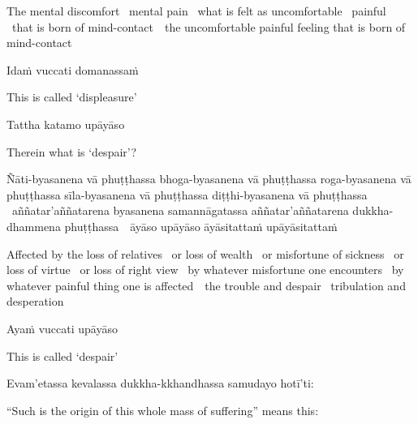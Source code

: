 \begin{english-hang-verses}
  The mental discomfort \breathmark\ mental pain \breathmark\ what is felt as uncomfortable \breathmark\ painful \breathmark\ that is born of \mbox{mind-contact}~\breathmark\ the uncomfortable painful feeling that is born of mind-contact
\end{english-hang-verses}

Idaṁ vuccati domanassaṁ

\begin{english}
  This is called `displeasure'
\end{english}

\ifninebythirteen\clearpage\fi

Tattha katamo upāyāso

\begin{english}
  Therein what is `despair'?
\end{english}

\begin{pali-hang}
  Ñāti-byasanena vā phuṭṭhassa bhoga-byasanena vā phuṭṭhassa roga-byasanena vā phuṭṭhassa sīla-byasanena vā phuṭṭhassa diṭṭhi-byasanena vā phuṭṭhassa \breathmark\ aññatar'aññatarena byasanena samannāgatassa aññatar'aññatarena dukkha-dhammena \mbox{phuṭṭhassa}~\breathmark\ āyāso upāyāso āyāsitattaṁ upāyāsitattaṁ
\end{pali-hang}

\begin{english-hang-verses}
  Affected by the loss of relatives \breathmark\ or loss of wealth \breathmark\ or misfortune of sickness \breathmark\ or loss of virtue \breathmark\ or loss of right view \breathmark\ by whatever misfortune one encounters \breathmark\ by whatever painful thing one is \mbox{affected}~\breathmark\ the trouble and despair \breathmark\ tribulation and desperation
\end{english-hang-verses}

Ayaṁ vuccati upāyāso

\begin{english}
  This is called `despair'
\end{english}

\begin{pali-hang}
Evam'etassa kevalassa dukkha-kkhandhassa samudayo hotī'ti:
\end{pali-hang}

\begin{english-hang}
  ``Such is the origin of this whole mass of suffering'' means this:
\end{english-hang}


